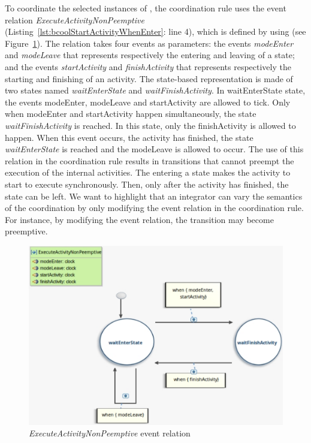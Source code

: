 To coordinate the selected instances of \dse, the coordination rule uses the event relation \emph{ExecuteActivityNonPeemptive} (Listing~\ref{lst:bcoolStartActivityWhenEnter}: line 4), which is defined by using \moccml (see Figure~\ref{fig:looprelation}). The relation takes four events as parameters: the events \emph{modeEnter} and \emph{modeLeave} that represents respectively the entering and leaving of a state; and the events \emph{startActivity} and \emph{finishActivity} that represents respectively the starting and finishing of an activity. The state-based representation is made of two states named \emph{waitEnterState} and \emph{waitFinishActivity}. In waitEnterState state, the events modeEnter, modeLeave and startActivity are allowed to tick. Only when modeEnter and startActivity happen simultaneously, the state \emph{waitFinishActivity} is reached. In this state, only the finishActivity is allowed to happen. When this event occurs, \ie the activity has finished, the state \emph{waitEnterState} is reached and the modeLeave is allowed to occur. The use of this relation in the coordination rule results in transitions that cannot preempt the execution of the internal activities. The entering a state makes the activity to start to execute synchronously. Then, only after the activity has finished, the state can be left. We want to highlight that an integrator can vary the semantics of the coordination by only modifying the event relation in the coordination rule. For instance, by modifying the event relation, the transition may become preemptive. 
	 
	 \begin{figure}[h]
	 	\center
	 	\includegraphics[width=.7\columnwidth]{examples/figs/ExecuteActivityNonPeemptive}
	 	\caption{\emph{ExecuteActivityNonPeemptive} event relation}
	 	\label{fig:looprelation}
	 \end{figure}
	 
